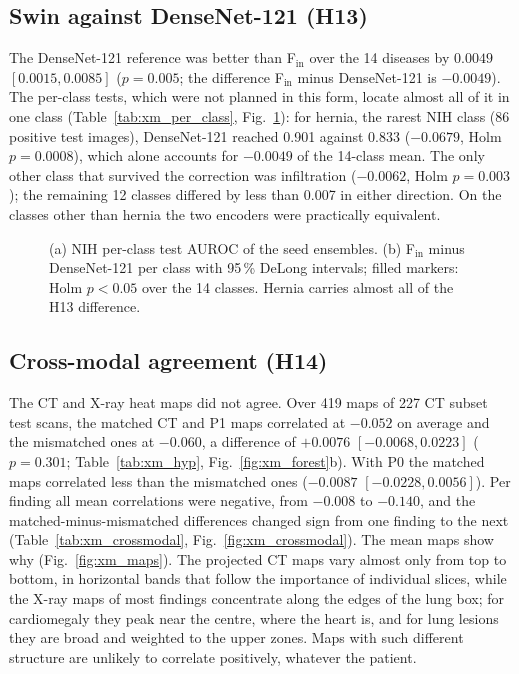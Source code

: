 \subsection{Swin against DenseNet-121 (H13)}
\label{sec:xm_res_h13}
The DenseNet-121 reference was better than F$_\mathrm{in}$ over the 14 diseases by $0.0049$ $[0.0015, 0.0085]$ ($p=0.005$; the difference
F$_\mathrm{in}$ minus DenseNet-121 is $-0.0049$). The per-class tests, which were not planned in this form, locate almost all of it in one
class (Table~\ref{tab:xm_per_class}, Fig.~\ref{fig:xm_per_class}): for hernia, the rarest NIH class (86 positive test images),
DenseNet-121 reached 0.901 against
0.833 ($-0.0679$, Holm $p=0.0008$), which alone accounts for $-0.0049$ of the 14-class mean. The only other class that survived the
correction was infiltration ($-0.0062$, Holm $p=0.003$); the remaining 12 classes differed by less than 0.007 in either direction. On the
classes other than hernia the two encoders were practically equivalent.

\begin{table}[htbp]
\centering\footnotesize
\caption{NIH per-class test AUROC of the seed ensembles, with the paired DeLong difference F$_\mathrm{in}$ minus DenseNet-121 and Holm over
the 14 classes (descriptive).}
\label{tab:xm_per_class}
\end{table}

\begin{figure}[htbp]
\centering
{}
\caption{(a) NIH per-class test AUROC of the seed ensembles. (b) F$_\mathrm{in}$ minus DenseNet-121 per class with 95\,\% DeLong
intervals; filled markers: Holm $p<0.05$ over the 14 classes. Hernia carries almost all of the H13 difference.}
\label{fig:xm_per_class}
\end{figure}

\subsection{Cross-modal agreement (H14)}
\label{sec:xm_res_h14}
The CT and X-ray heat maps did not agree. Over 419 maps of 227 CT subset test scans, the matched CT and P1 maps correlated at $-0.052$ on
average and the mismatched ones at $-0.060$, a difference of $+0.0076$ $[-0.0068, 0.0223]$ ($p=0.301$; Table~\ref{tab:xm_hyp},
Fig.~\ref{fig:xm_forest}b). With P0 the matched maps correlated less than the mismatched ones ($-0.0087$ $[-0.0228, 0.0056]$). Per
finding all mean correlations were negative, from $-0.008$ to $-0.140$, and the matched-minus-mismatched differences changed sign from one
finding to the next (Table~\ref{tab:xm_crossmodal}, Fig.~\ref{fig:xm_crossmodal}). The mean maps show why (Fig.~\ref{fig:xm_maps}). The
projected CT maps vary almost only from top to bottom, in horizontal bands that follow the importance of individual slices, while the
X-ray maps of most findings concentrate along the edges of the lung box; for cardiomegaly they peak near the centre, where the heart is,
and for lung lesions they are broad and weighted to the upper zones. Maps with such different structure are unlikely to correlate
positively, whatever the patient.


